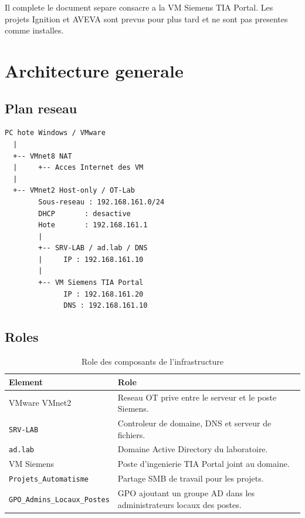 \documentclass[11pt,a4paper]{article}
\begin{document}
Il complete le document separe consacre a la VM Siemens TIA Portal.
Les projets Ignition et AVEVA sont prevus pour plus tard et ne sont pas
presentes comme installes.

\section{Architecture generale}

\subsection{Plan reseau}

\begin{lstlisting}
PC hote Windows / VMware
  |
  +-- VMnet8 NAT
  |     +-- Acces Internet des VM
  |
  +-- VMnet2 Host-only / OT-Lab
        Sous-reseau : 192.168.161.0/24
        DHCP       : desactive
        Hote       : 192.168.161.1
        |
        +-- SRV-LAB / ad.lab / DNS
        |     IP : 192.168.161.10
        |
        +-- VM Siemens TIA Portal
              IP : 192.168.161.20
              DNS : 192.168.161.10
\end{lstlisting}

\subsection{Roles}

\begin{table}[H]
\centering
\begin{tabularx}{\textwidth}{lX}
\toprule
\textbf{Element} & \textbf{Role} \\
\midrule
VMware VMnet2 & Reseau OT prive entre le serveur et le poste Siemens. \\
\texttt{SRV-LAB} & Controleur de domaine, DNS et serveur de fichiers. \\
\texttt{ad.lab} & Domaine Active Directory du laboratoire. \\
VM Siemens & Poste d'ingenierie TIA Portal joint au domaine. \\
\texttt{Projets\_Automatisme} & Partage SMB de travail pour les projets. \\
\texttt{GPO\_Admins\_Locaux\_Postes} & GPO ajoutant un groupe AD dans les administrateurs locaux des postes. \\
\bottomrule
\end{tabularx}
\caption{Role des composants de l'infrastructure}
\end{table}
\end{document}
